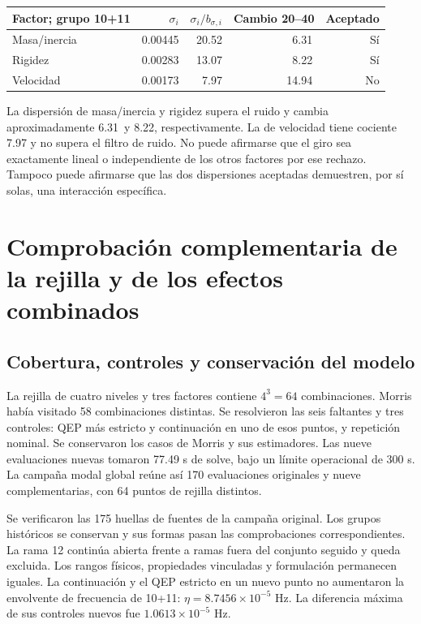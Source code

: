 \documentclass[11pt,a4paper]{article}
\newcommand{\pct}{\text{\char37}}
\begin{document}
\begin{center}\small
\begin{tabular}{lrrrr}
\toprule Factor; grupo 10+11 & $\sigma_i$ & $\sigma_i/b_{\sigma,i}$ & Cambio 20--40 & Aceptado \\ \midrule
Masa/inercia & 0.00445 & 20.52 & 6.31\,\pct & Sí \\
Rigidez & 0.00283 & 13.07 & 8.22\,\pct & Sí \\
Velocidad & 0.00173 & 7.97 & 14.94\,\pct & No \\

\bottomrule
\end{tabular}
\end{center}
La dispersión de masa/inercia y rigidez supera el ruido y cambia aproximadamente 6.31\pct\ y 8.22\pct, respectivamente. La de velocidad tiene cociente 7.97 y no supera el filtro de ruido. No puede afirmarse que el giro sea exactamente lineal o independiente de los otros factores por ese rechazo. Tampoco puede afirmarse que las dos dispersiones aceptadas demuestren, por sí solas, una interacción específica.








\clearpage
\section{Comprobación complementaria de la rejilla y de los efectos combinados}
\subsection{Cobertura, controles y conservación del modelo}
La rejilla de cuatro niveles y tres factores contiene $4^3=64$ combinaciones. Morris había visitado 58 combinaciones distintas. Se resolvieron las seis faltantes y tres controles: QEP más estricto y continuación en uno de esos puntos, y repetición nominal. Se conservaron los casos de Morris y sus estimadores. Las nueve evaluaciones nuevas tomaron 77.49 s de solve, bajo un límite operacional de 300 s. La campaña modal global reúne así 170 evaluaciones originales y nueve complementarias, con 64 puntos de rejilla distintos.

Se verificaron las 175 huellas de fuentes de la campaña original. Los grupos históricos se conservan y sus formas pasan las comprobaciones correspondientes. La rama 12 continúa abierta frente a ramas fuera del conjunto seguido y queda excluida. Los rangos físicos, propiedades vinculadas y formulación permanecen iguales. La continuación y el QEP estricto en un nuevo punto no aumentaron la envolvente de frecuencia de 10+11: $\eta=8.7456\times10^{-5}$ Hz. La diferencia máxima de sus controles nuevos fue $1.0613\times10^{-5}$ Hz.
\end{document}
